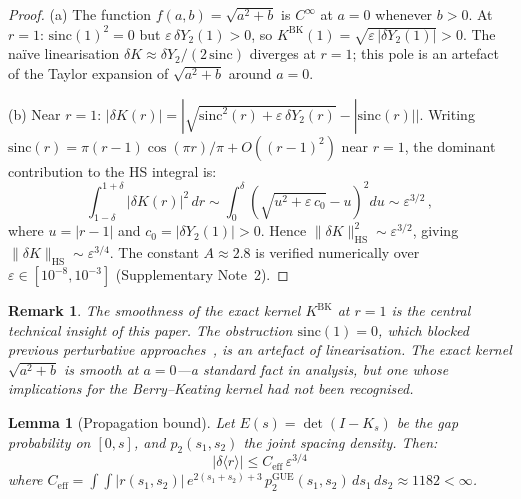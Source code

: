 \documentclass[10pt]{article}
\newtheorem{lemma}[theorem]{Lemma}
\newtheorem{remark}[theorem]{Remark}
\begin{document}
\begin{proof}
\textup{(a)} The function $f(a, b) = \sqrt{a^2 + b}$ is $C^\infty$ at
$a = 0$ whenever $b > 0$. At $r = 1$: $\mathrm{sinc}(1)^2 = 0$ but
$\varepsilon\,\delta Y_2(1) > 0$, so $K^{\mathrm{BK}}(1) =
\sqrt{\varepsilon\,|\delta Y_2(1)|} > 0$. The na\"ive linearisation
$\delta K \approx \delta Y_2/(2\,\mathrm{sinc})$ diverges at $r = 1$; this
pole is an artefact of the Taylor expansion of $\sqrt{a^2 + b}$ around
$a = 0$.

\textup{(b)} Near $r = 1$:
$|\delta K(r)| = |\sqrt{\mathrm{sinc}^2(r) + \varepsilon\,\delta Y_2(r)}
- |\mathrm{sinc}(r)||$.
Writing $\mathrm{sinc}(r) = \pi(r-1)\cos(\pi r)/\pi + O((r-1)^2)$ near
$r = 1$, the dominant contribution to the HS integral is:
\begin{equation}
\int_{1-\delta}^{1+\delta} |\delta K(r)|^2\,dr
\sim \int_0^\delta \left(\sqrt{u^2 + \varepsilon\,c_0}
- u\right)^2 du \sim \varepsilon^{3/2}\,,
\end{equation}
where $u = |r - 1|$ and $c_0 = |\delta Y_2(1)| > 0$. Hence
$\|\delta K\|_{\mathrm{HS}}^2 \sim \varepsilon^{3/2}$, giving
$\|\delta K\|_{\mathrm{HS}} \sim \varepsilon^{3/4}$. The constant
$A \approx 2.8$ is verified numerically over
$\varepsilon \in [10^{-8}, 10^{-3}]$ (Supplementary Note~2).
\end{proof}

\begin{remark}
The smoothness of the exact kernel $K^{\mathrm{BK}}$ at $r = 1$ is the
central technical insight of this paper. The obstruction
$\mathrm{sinc}(1) = 0$, which blocked previous perturbative
approaches~\cite{alarcon2026a}, is an artefact of linearisation. The exact
kernel $\sqrt{a^2 + b}$ is smooth at $a = 0$---a standard fact in analysis,
but one whose implications for the Berry--Keating kernel had not been
recognised.
\end{remark}

\begin{lemma}[Propagation bound]\label{lem:propagation}
Let $E(s) = \det(I - K_s)$ be the gap probability on $[0, s]$, and
$p_2(s_1, s_2)$ the joint spacing density. Then:
\begin{equation}
|\delta\langle r\rangle| \leq C_{\mathrm{eff}}\,\varepsilon^{3/4}
\end{equation}
where $C_{\mathrm{eff}} = \int\!\!\int |r(s_1,s_2)|\,
e^{2(s_1+s_2)+3}\,p_2^{\mathrm{GUE}}(s_1, s_2)\,ds_1\,ds_2
\approx 1182 < \infty$.
\end{lemma}
\end{document}
